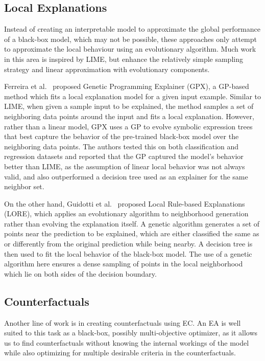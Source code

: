 \documentclass[graybox]{svmult}
\begin{document}
\subsection{Local Explanations}

Instead of creating an interpretable model to approximate the global performance of a black-box model, which may not be possible, these approaches only attempt to approximate the local behaviour using an evolutionary algorithm. Much work in this area is inspired by LIME, but enhance the relatively simple sampling strategy and linear approximation with evolutionary components.

Ferreira et al.~\cite{GP-localExp_Ferreira_CEC_20} proposed Genetic Programming Explainer (GPX), a GP-based method which fits a local explanation model for a given input example. Similar to LIME, when given a sample input to be explained, the method samples a set of neighboring data points around the input and fits a local explanation. However, rather than a linear model, GPX uses a GP to evolve symbolic expression trees that best capture the behavior of the pre-trained black-box model over the neighboring data points. The authors tested this on both classification and regression datasets and reported that the GP captured the model's behavior better than LIME, as the assumption of linear local behavior was not always valid, and also outperformed a decision tree used as an explainer for the same neighbor set.

On the other hand, Guidotti et al.~\cite{guidottiLocalRuleBasedExplanations2018} proposed Local Rule-based Explanations (LORE), which applies an evolutionary algorithm to neighborhood generation rather than evolving the explanation itself. A genetic algorithm generates a set of points near the prediction to be explained, which are either classified the same as or differently from the original prediction while being nearby. A decision tree is then used to fit the local behavior of the black-box model. The use of a genetic algorithm here ensures a dense sampling of points in the local neighborhood which lie on both sides of the decision boundary.

\subsection{Counterfactuals}

Another line of work is in creating counterfactuals using EC. An EA is well suited to this task as a black-box, possibly multi-objective optimizer, as it allows us to find counterfactuals without knowing the internal workings of the model while also optimizing for multiple desirable criteria in the counterfactuals.
\end{document}
